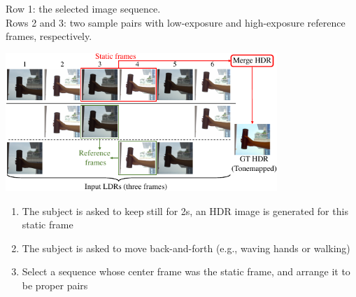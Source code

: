 \documentclass[landscape,a0paper,fontscale=0.292]{baposter}
\begin{document}
\begin{poster}
{\begin{minipage}[t]{0.54\linewidth}
        {\scriptsize Row 1: the selected image sequence.\\[-0.5em]
            Rows 2 and 3: two sample pairs with low-exposure and high-exposure reference frames, respectively.}
        \vspace{-0.7em}
        \begin{center}
            \includegraphics[width=0.77\textwidth]{images/dynamic_gt_preparation-crop.pdf}
        \end{center}
        \vspace{-0.7em}
        \begin{enumerate}
            \scriptsize
            \item The subject is asked to keep still for 2s, an HDR image is generated for this static frame
            \item The subject is asked to move back-and-forth (e.g., waving hands or walking)
            \item Select a sequence whose center frame was the static frame, and arrange it to be proper pairs 
        \end{enumerate}
    \end{minipage}

}
\end{poster}
\end{document}
